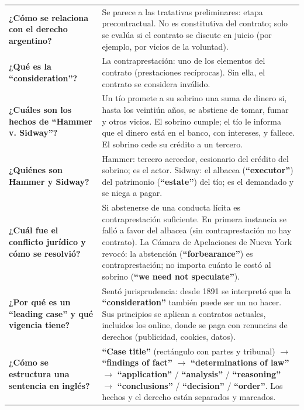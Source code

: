 \documentclass[12pt,oneside]{book}
\begin{document}
\begin{longtable}{
    >{\raggedright\arraybackslash}p{}
    >{\raggedright\arraybackslash}p{}
}
\textbf{¿Cómo se relaciona con el derecho argentino?} &
Se parece a las tratativas preliminares: etapa precontractual. No es constitutiva del contrato; solo se evalúa si el contrato se discute en juicio (por ejemplo, por vicios de la voluntad). \\

\textbf{¿Qué es la ``consideration''?} &
La contraprestación: uno de los elementos del contrato (prestaciones recíprocas). Sin ella, el contrato se considera inválido. \\

\textbf{¿Cuáles son los hechos de ``Hammer v. Sidway''?} &
Un tío promete a su sobrino una suma de dinero si, hasta los veintiún años, se abstiene de tomar, fumar y otros vicios. El sobrino cumple; el tío le informa que el dinero está en el banco, con intereses, y fallece. El sobrino cede su crédito a un tercero. \\

\textbf{¿Quiénes son Hammer y Sidway?} &
Hammer: tercero acreedor, cesionario del crédito del sobrino; es el actor. Sidway: el albacea (\textbf{``executor''}) del patrimonio (\textbf{``estate''}) del tío; es el demandado y se niega a pagar. \\

\textbf{¿Cuál fue el conflicto jurídico y cómo se resolvió?} &
Si abstenerse de una conducta lícita es contraprestación suficiente. En primera instancia se falló a favor del albacea (sin contraprestación no hay contrato). La Cámara de Apelaciones de Nueva York revocó: la abstención (\textbf{``forbearance''}) es contraprestación; no importa cuánto le costó al sobrino (\textbf{``we need not speculate''}). \\

\textbf{¿Por qué es un ``leading case'' y qué vigencia tiene?} &
Sentó jurisprudencia: desde 1891 se interpretó que la \textbf{``consideration''} también puede ser un no hacer. Sus principios se aplican a contratos actuales, incluidos los online, donde se paga con renuncias de derechos (publicidad, cookies, datos). \\

\textbf{¿Cómo se estructura una sentencia en inglés?} &
\textbf{``Case title''} (rectángulo con partes y tribunal) $\rightarrow$ \textbf{``findings of fact''} $\rightarrow$ \textbf{``determinations of law''} $\rightarrow$ \textbf{``application''} / \textbf{``analysis''} / \textbf{``reasoning''} $\rightarrow$ \textbf{``conclusions''} / \textbf{``decision''} / \textbf{``order''}. Los hechos y el derecho están separados y marcados. \\


\end{longtable}
\end{document}
